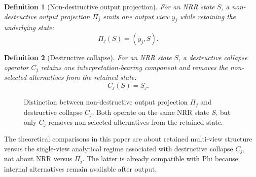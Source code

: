 \documentclass[11pt,a4paper]{article}
\newtheorem{definition}{Definition}
\begin{document}
\begin{definition}[Non-destructive output projection]
For an NRR state $S$, a non-destructive output projection $\Pi_j$ emits one output view $y_j$ while retaining the underlying state:
\begin{equation}
\Pi_j(S) = (y_j, S).
\end{equation}
\end{definition}

\begin{definition}[Destructive collapse]
For an NRR state $S$, a destructive collapse operator $C_j$ retains one interpretation-bearing component and removes the non-selected alternatives from the retained state:
\begin{equation}
C_j(S) = S_j.
\end{equation}
\end{definition}
\begin{figure}[t]
\centering
{}
\caption{Distinction between non-destructive output projection $\Pi_j$ and destructive collapse $C_j$. Both operate on the same NRR state $S$, but only $C_j$ removes non-selected alternatives from the retained state.}
\label{fig:projection_vs_collapse}
\end{figure}

The theoretical comparisons in this paper are about retained multi-view structure versus the single-view analytical regime associated with destructive collapse $C_j$, not about NRR versus $\Pi_j$. The latter is already compatible with Phi because internal alternatives remain available after output.
\end{document}
